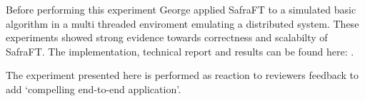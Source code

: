   
 
Before performing this experiment George applied SafraFT to a simulated basic algorithm in a multi threaded enviroment emulating a distributed system.
These experiments showed strong evidence towards correctness and scalabilty of SafraFT.
The implementation, technical report and results can be found here: \cite{georgework}.

The experiment presented here is performed as reaction to reviewers feedback to add `compelling end-to-end application'.
  

  